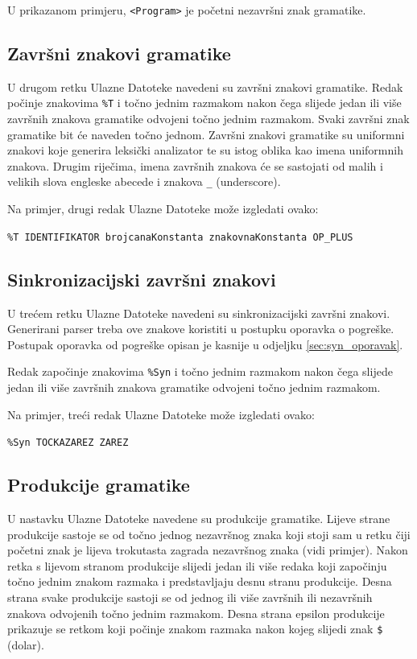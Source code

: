 \documentclass[times, 12pt, utf8]{book}
\begin{document}
U prikazanom primjeru, \verb|<Program>| je početni nezavršni znak gramatike.

\subsection{Završni znakovi gramatike}

U drugom retku Ulazne Datoteke navedeni su završni znakovi gramatike.
Redak počinje znakovima \verb|%T| i točno jednim razmakom nakon čega slijede jedan ili više završnih znakova gramatike odvojeni točno jednim razmakom.
Svaki završni znak gramatike bit će naveden točno jednom.
Završni znakovi gramatike su uniformni znakovi koje generira leksički analizator te su istog oblika kao imena uniformnih znakova.
Drugim riječima, imena završnih znakova će se sastojati od malih i velikih slova engleske abecede i znakova \verb|_| (underscore).

Na primjer, drugi redak Ulazne Datoteke može izgledati ovako:

\verb|%T IDENTIFIKATOR brojcanaKonstanta znakovnaKonstanta OP_PLUS|

\subsection{Sinkronizacijski završni znakovi}

U trećem retku Ulazne Datoteke navedeni su sinkronizacijski završni znakovi.
Generirani parser treba ove znakove koristiti u postupku oporavka o pogreške.
Postupak oporavka od pogreške opisan je kasnije u odjeljku \ref{sec:syn_oporavak}.

Redak započinje znakovima \verb|%Syn| i točno jednim razmakom nakon čega slijede jedan ili više završnih znakova gramatike odvojeni točno jednim razmakom.

Na primjer, treći redak Ulazne Datoteke može izgledati ovako:

\verb|%Syn TOCKAZAREZ ZAREZ|

\subsection{Produkcije gramatike}
U nastavku Ulazne Datoteke navedene su produkcije gramatike.
Lijeve strane produkcije sastoje se od točno jednog nezavršnog znaka koji stoji sam u retku čiji početni znak je lijeva trokutasta zagrada nezavršnog znaka (vidi primjer).
Nakon retka s lijevom stranom produkcije slijedi jedan ili više redaka koji započinju točno jednim znakom razmaka i predstavljaju desnu stranu produkcije.
Desna strana svake produkcije sastoji se od jednog ili više završnih ili nezavršnih znakova odvojenih točno jednim razmakom.
Desna strana epsilon produkcije prikazuje se retkom koji počinje znakom razmaka nakon kojeg slijedi znak \verb|$| (dolar).
\end{document}
